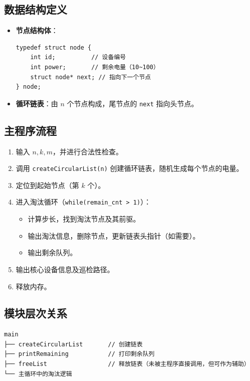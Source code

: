 \documentclass[UTF8]{ctexart}
\begin{document}
\subsection{数据结构定义}
\begin{itemize}
    \item \textbf{节点结构体}：
\begin{lstlisting}
typedef struct node {
    int id;          // 设备编号
    int power;       // 剩余电量（10~100）
    struct node* next; // 指向下一个节点
} node;
\end{lstlisting}
    \item \textbf{循环链表}：由 \( n \) 个节点构成，尾节点的 \texttt{next} 指向头节点。
\end{itemize}

\subsection{主程序流程}
\begin{enumerate}
    \item 输入 \( n, k, m \)，并进行合法性检查。
    \item 调用 \texttt{createCircularList(n)} 创建循环链表，随机生成每个节点的电量。
    \item 定位到起始节点（第 \( k \) 个）。
    \item 进入淘汰循环（\texttt{while(remain\_cnt > 1)}）：
        \begin{itemize}
            \item 计算步长，找到淘汰节点及其前驱。
            \item 输出淘汰信息，删除节点，更新链表头指针（如需要）。
            \item 输出剩余队列。
        \end{itemize}
    \item 输出核心设备信息及巡检路径。
    \item 释放内存。
\end{enumerate}

\subsection{模块层次关系}
\begin{verbatim}
main
├── createCircularList       // 创建链表
├── printRemaining           // 打印剩余队列
├── freeList                 // 释放链表（未被主程序直接调用，但可作为辅助）
└── 主循环中的淘汰逻辑
\end{verbatim}
\end{document}
